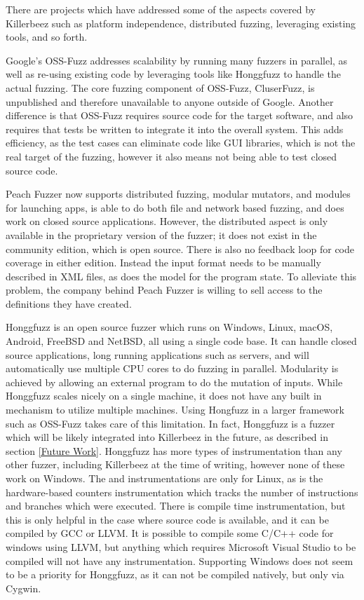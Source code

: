 There are projects which have addressed some of the aspects covered by Killerbeez
such as platform independence, distributed fuzzing, leveraging existing tools,
and so forth.

Google's OSS-Fuzz\cite{ossfuzz} addresses scalability by running many fuzzers
in parallel, as well as re-using existing code by leveraging tools like
Honggfuzz to handle the actual fuzzing. The core fuzzing component of OSS-Fuzz,
CluserFuzz, is unpublished and therefore unavailable to anyone outside of
Google.  Another difference is that OSS-Fuzz requires source code for the
target software, and also requires that tests be written to integrate it
into the overall system. This adds efficiency, as the test cases can eliminate
code like GUI libraries, which is not the real target of the fuzzing, however
it also means not being able to test closed source code.

Peach Fuzzer\cite{peach} now supports distributed fuzzing, modular mutators, and
modules for launching apps, is able to do both file and network based fuzzing,
and does work on closed source applications.  However, the distributed aspect
is only available in the proprietary version of the fuzzer; it does not exist
in the community edition, which is open source. There is also no feedback loop
for code coverage in either edition.  Instead the input format needs to be
manually described in XML files, as does the model for the program state. To
alleviate this problem, the company behind Peach Fuzzer is willing to sell
access to the definitions they have created.

Honggfuzz\cite{honggfuzz} is an open source fuzzer which runs on Windows, Linux,
macOS, Android, FreeBSD and NetBSD, all using a single code base. It can handle
closed source applications, long running applications such as servers, and will
automatically use multiple CPU cores to do fuzzing in parallel. Modularity is
achieved by allowing an external program to do the mutation of inputs. While
Honggfuzz scales nicely on a single machine, it does not have any built in
mechanism to utilize multiple machines.  Using Hongfuzz in a larger framework
such as OSS-Fuzz takes care of this limitation.  In fact, Honggfuzz is a fuzzer
which will be likely integrated into Killerbeez in the future, as described in
section \ref{Future Work}. Honggfuzz has more types of instrumentation than any
other fuzzer, including Killerbeez at the time of writing, however none of
these work on Windows. The \BTS{} and \IPT{} instrumentations are only for
Linux, as is the hardware-based counters instrumentation which tracks the
number of instructions and branches which were executed. There is compile time
instrumentation, but this is only helpful in the case where source code is
available, and it can be compiled by GCC or LLVM.  It is possible to compile
some C/C++ code for windows using LLVM, but anything which requires Microsoft
Visual Studio to be compiled will not have any instrumentation.  Supporting
Windows does not seem to be a priority for Honggfuzz, as it can not be compiled
natively, but only via Cygwin.

